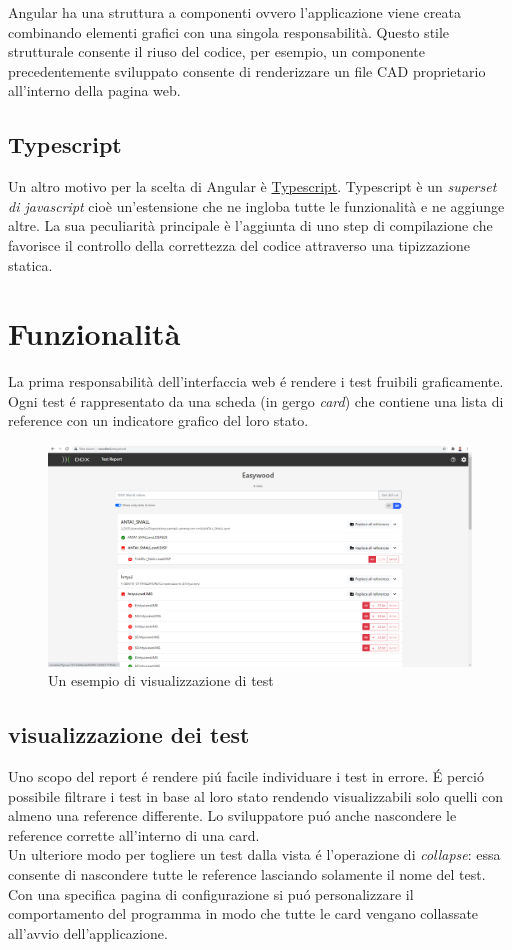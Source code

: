             Angular ha una struttura a componenti ovvero l'applicazione viene creata combinando elementi grafici con una singola responsabilità.
            Questo stile strutturale consente il riuso del codice, per esempio, un componente precedentemente sviluppato consente
            di renderizzare un file CAD proprietario all'interno della pagina web.
        
        \subsection{Typescript}
            Un altro motivo per la scelta di Angular è \href{https://www.typescriptlang.org}{Typescript}.
            Typescript è un \textit{superset di javascript} cioè un'estensione che ne ingloba tutte le funzionalità e ne aggiunge altre.
            La sua peculiarità principale è l'aggiunta di uno step di compilazione che favorisce il controllo della correttezza del codice attraverso una tipizzazione statica.
    \section{Funzionalità}
        La prima responsabilità dell'interfaccia web \'e rendere i test fruibili graficamente.
        Ogni test \'e rappresentato da una scheda (in gergo \textit{card}) che contiene una lista di reference con un indicatore grafico del loro stato.
        \begin{figure}
            \includegraphics[width=\textwidth]{images/page.png}
            \caption{Un esempio di visualizzazione di test}
        \end{figure}
        \subsection{visualizzazione dei test}        
            Uno scopo del report \'e rendere pi\'u facile individuare i test in errore.
            \'E perci\'o possibile filtrare i test in base al loro stato rendendo visualizzabili solo quelli con almeno una reference differente.
            Lo sviluppatore pu\'o anche nascondere le reference corrette all'interno di una card.\\
            Un ulteriore modo per togliere un test dalla vista \'e l'operazione di \textit{collapse}: essa consente di nascondere tutte le reference lasciando solamente il nome del test.
            Con una specifica pagina di configurazione si pu\'o personalizzare il comportamento del programma in modo che tutte le card vengano collassate all'avvio dell'applicazione.
            
